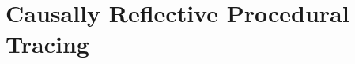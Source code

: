 \chapter{Causally Reflective Procedural Tracing}
\label{chapter:causally_reflective_procedural_tracing}

